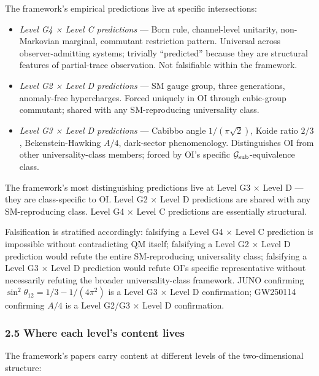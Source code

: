 \documentclass[
]{article}
\providecommand{\tightlist}{%
  \setlength{\itemsep}{0pt}\setlength{\parskip}{0pt}}
\begin{document}
The framework's empirical predictions live at specific intersections:

\begin{itemize}
\tightlist
\item
  \emph{Level G4 × Level C predictions} --- Born rule, channel-level
  unitarity, non-Markovian marginal, commutant restriction pattern.
  Universal across observer-admitting systems; trivially ``predicted''
  because they are structural features of partial-trace observation. Not
  falsifiable within the framework.
\item
  \emph{Level G2 × Level D predictions} --- SM gauge group, three
  generations, anomaly-free hypercharges. Forced uniquely in OI through
  cubic-group commutant; shared with any SM-reproducing universality
  class.
\item
  \emph{Level G3 × Level D predictions} --- Cabibbo angle
  \(1/(\pi\sqrt{2})\), Koide ratio \(2/3\), Bekenstein-Hawking \(A/4\),
  dark-sector phenomenology. Distinguishes OI from other
  universality-class members; forced by OI's specific
  \(\mathcal{G}_{\rm sub}\)-equivalence class.
\end{itemize}

The framework's most distinguishing predictions live at Level G3 × Level
D --- they are class-specific to OI. Level G2 × Level D predictions are
shared with any SM-reproducing class. Level G4 × Level C predictions are
essentially structural.

Falsification is stratified accordingly: falsifying a Level G4 × Level C
prediction is impossible without contradicting QM itself; falsifying a
Level G2 × Level D prediction would refute the entire SM-reproducing
universality class; falsifying a Level G3 × Level D prediction would
refute OI's specific representative without necessarily refuting the
broader universality-class framework. JUNO confirming
\(\sin^2\theta_{12} = 1/3 - 1/(4\pi^2)\) is a Level G3 × Level D
confirmation; GW250114 confirming \(A/4\) is a Level G2/G3 × Level D
confirmation.

\hypertarget{where-each-levels-content-lives}{%
\subsubsection{2.5 Where each level's content
lives}\label{where-each-levels-content-lives}}

The framework's papers carry content at different levels of the
two-dimensional structure:
\end{document}
